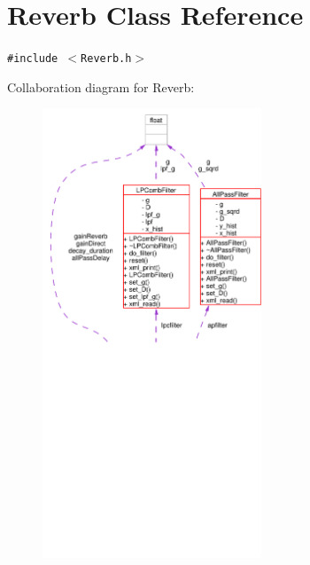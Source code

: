 \hypertarget{classReverb}{
\section{Reverb Class Reference}
\label{classReverb}
}
{\tt \#include $<$Reverb.h$>$}

Collaboration diagram for Reverb:\begin{figure}[H]
\begin{center}
\leavevmode
\includegraphics[width=185pt]{classReverb__coll__graph}
\end{center}
\end{figure}
